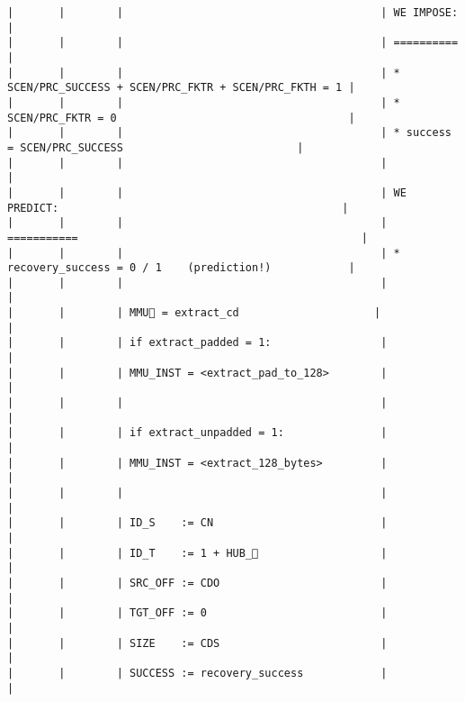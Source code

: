 \documentclass[varwidth=\maxdimen,margin=0.5cm,multi={verbatim}]{standalone}
\begin{document}
\begin{verbatim}
|       |        |                                        | WE IMPOSE:                                             |
|       |        |                                        | ==========                                             |
|       |        |                                        | * SCEN/PRC_SUCCESS + SCEN/PRC_FKTR + SCEN/PRC_FKTH = 1 |
|       |        |                                        | * SCEN/PRC_FKTR = 0                                    |
|       |        |                                        | * success = SCEN/PRC_SUCCESS                           |
|       |        |                                        |                                                        |
|       |        |                                        | WE PREDICT:                                            |
|       |        |                                        | ===========                                            |
|       |        |                                        | * recovery_success = 0 / 1    (prediction!)            |
|       |        |                                        |                                                        |
|       |        | MMU🏴 = extract_cd                     |                                                        |
|       |        | if extract_padded = 1:                 |                                                        |
|       |        | MMU_INST = <extract_pad_to_128>        |                                                        |
|       |        |                                        |                                                        |
|       |        | if extract_unpadded = 1:               |                                                        |
|       |        | MMU_INST = <extract_128_bytes>         |                                                        |
|       |        |                                        |                                                        |
|       |        | ID_S    := CN                          |                                                        |
|       |        | ID_T    := 1 + HUB_                   |                                                        |
|       |        | SRC_OFF := CDO                         |                                                        |
|       |        | TGT_OFF := 0                           |                                                        |
|       |        | SIZE    := CDS                         |                                                        |
|       |        | SUCCESS := recovery_success            |                                                        |

\end{verbatim}
\end{document}
